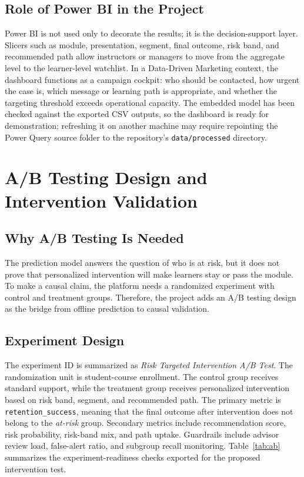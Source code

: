 \documentclass[conference]{IEEEtran}
\newcommand{\risk}{\textit{at-risk}}
\begin{document}
\subsection{Role of Power BI in the Project}

Power BI is not used only to decorate the results; it is the decision-support layer. Slicers such as module, presentation, segment, final outcome, risk band, and recommended path allow instructors or managers to move from the aggregate level to the learner-level watchlist. In a Data-Driven Marketing context, the dashboard functions as a campaign cockpit: who should be contacted, how urgent the case is, which message or learning path is appropriate, and whether the targeting threshold exceeds operational capacity. The embedded model has been checked against the exported CSV outputs, so the dashboard is ready for demonstration; refreshing it on another machine may require repointing the Power Query source folder to the repository's \texttt{data/processed} directory.

\section{A/B Testing Design and Intervention Validation}

\subsection{Why A/B Testing Is Needed}

The prediction model answers the question of who is at risk, but it does not prove that personalized intervention will make learners stay or pass the module. To make a causal claim, the platform needs a randomized experiment with control and treatment groups. Therefore, the project adds an A/B testing design as the bridge from offline prediction to causal validation.

\subsection{Experiment Design}

The experiment ID is summarized as \textit{Risk Targeted Intervention A/B Test}. The randomization unit is student-course enrollment. The control group receives standard support, while the treatment group receives personalized intervention based on risk band, segment, and recommended path. The primary metric is \texttt{retention\_success}, meaning that the final outcome after intervention does not belong to the \risk{} group. Secondary metrics include recommendation score, risk probability, risk-band mix, and path uptake. Guardrails include advisor review load, false-alert ratio, and subgroup recall monitoring. Table~\ref{tab:ab} summarizes the experiment-readiness checks exported for the proposed intervention test.
\end{document}

